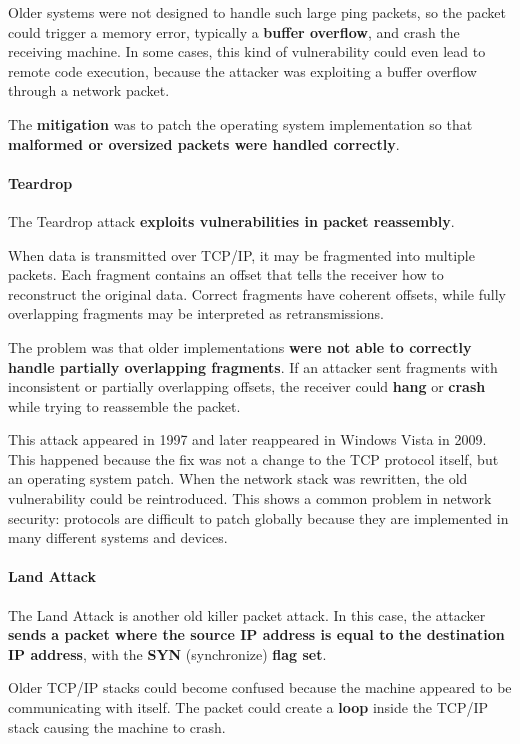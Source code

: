 \documentclass{article}
\begin{document}
Older systems were not designed to handle such large ping packets, so the packet could trigger a memory error, typically a \textbf{buffer overflow}, and crash the receiving machine. In some cases, this kind of vulnerability could even lead to remote code execution, because the attacker was exploiting a buffer overflow through a network packet.

The \textbf{mitigation} was to patch the operating system implementation so that \textbf{malformed or oversized packets were handled correctly}.

\paragraph{Teardrop}

The Teardrop attack \textbf{exploits vulnerabilities in packet reassembly}.

When data is transmitted over TCP/IP, it may be fragmented into multiple packets. Each fragment contains an offset that tells the receiver how to reconstruct the original data. Correct fragments have coherent offsets, while fully overlapping fragments may be interpreted as retransmissions.

The problem was that older implementations \textbf{were not able to correctly handle partially overlapping fragments}. If an attacker sent fragments with inconsistent or partially overlapping offsets, the receiver could \textbf{hang} or \textbf{crash} while trying to reassemble the packet.

This attack appeared in 1997 and later reappeared in Windows Vista in 2009. This happened because the fix was not a change to the TCP protocol itself, but an operating system patch. When the network stack was rewritten, the old vulnerability could be reintroduced. This shows a common problem in network security: protocols are difficult to patch globally because they are implemented in many different systems and devices.

\paragraph{Land Attack}

The Land Attack is another old killer packet attack. In this case, the attacker \textbf{sends a packet where the source IP address is equal to the destination IP address}, with the \textbf{SYN} (synchronize) \textbf{flag set}.

Older TCP/IP stacks could become confused because the machine appeared to be communicating with itself. The packet could create a \textbf{loop} inside the TCP/IP stack causing the machine to crash.
\end{document}

